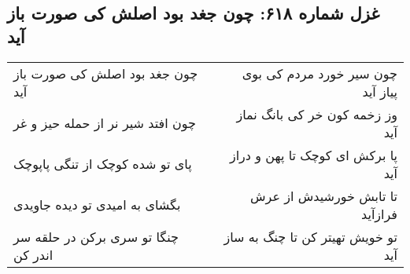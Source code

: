 \begin{center}
\section*{غزل شماره ۶۱۸: چون جغد بود اصلش کی صورت باز آید}
\label{sec:0618}
\begin{longtable}{l p{0.5cm} r}
چون جغد بود اصلش کی صورت باز آید
&&
چون سیر خورد مردم کی بوی پیاز آید
\\
چون افتد شیر نر از حمله حیز و غر
&&
وز زخمه کون خر کی بانگ نماز آید
\\
پای تو شده کوچک از تنگی پاپوچک
&&
پا برکش ای کوچک تا پهن و دراز آید
\\
بگشای به امیدی تو دیده جاویدی
&&
تا تابش خورشیدش از عرش فرازآید
\\
چنگا تو سری برکن در حلقه سر اندر کن
&&
تو خویش تهیتر کن تا چنگ به ساز آید
\\
\end{longtable}
\end{center}
